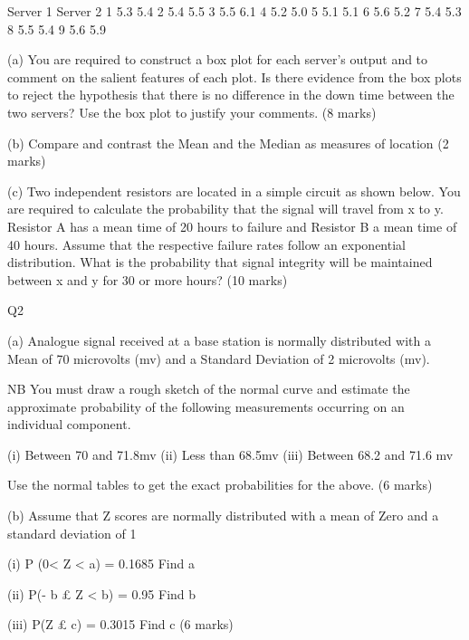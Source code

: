 	Server 1	Server 2
1	5.3	5.4
2	5.4	5.5
3	5.5	6.1
4	5.2	5.0
5	5.1	5.1
6	5.6	5.2
7	5.4	5.3
8	5.5	5.4
9	5.6	5.9


(a)	You are required to construct a box plot for each server’s output and to comment on the salient features of each plot.  Is there evidence from the box plots to reject the hypothesis that there is no difference in the down time between the two servers?  Use the box plot to justify your comments. 							(8 marks)

(b)	Compare and contrast the Mean and the Median as measures of location
(2 marks)

(c)	Two independent resistors are located in a simple circuit as shown below.  You are required to calculate the probability that the signal will travel from x to y.  Resistor A has a mean time of 20 hours to failure and Resistor B a mean time of 40 hours.  Assume that the respective failure rates follow an exponential distribution.  What is the probability that signal integrity will be maintained between x and y for 30 or more hours?
(10 marks)











 


Q2


(a)	Analogue signal received at a base station is normally distributed with a Mean of 70 microvolts (mv) and a Standard Deviation of 2 microvolts (mv).

NB 	You must draw a rough sketch of the normal curve and estimate the approximate probability of the following measurements occurring on an individual component. 
 
(i)	 Between 70 and 71.8mv
(ii)	 Less than 68.5mv
(iii)	 Between 68.2 and 71.6 mv

Use the normal tables to get the exact probabilities for the above.
										(6 marks)



(b)	Assume that Z scores are normally distributed with a mean of Zero and a
 	standard deviation of 1
 
(i) 	P (0< Z < a)  =  0.1685 			 Find   a 

(ii)            P(- b £ Z < b) =  0.95		            	 Find   b

     	(iii)             P(Z £ c)  =       0.3015 			 Find   c
										(6 marks)
									
						

